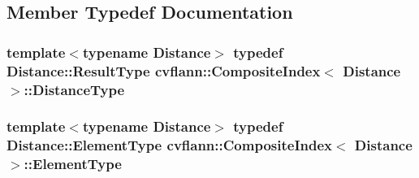 \subsection{Member Typedef Documentation}
\hypertarget{classcvflann_1_1CompositeIndex_a9970db892c04fb4dcb0b8a1c2e80a165}{
\subsubsection[{Distance\-Type}]{\setlength{\rightskip}{0pt plus 5cm}template$<$typename Distance$>$ typedef Distance\-::\-Result\-Type {\bf cvflann\-::\-Composite\-Index}$<$ Distance $>$\-::{\bf Distance\-Type}}}\label{classcvflann_1_1CompositeIndex_a9970db892c04fb4dcb0b8a1c2e80a165}
\hypertarget{classcvflann_1_1CompositeIndex_a3953e495ac70dfec4d1165a8f95b5fad}{
\subsubsection[{Element\-Type}]{\setlength{\rightskip}{0pt plus 5cm}template$<$typename Distance$>$ typedef Distance\-::\-Element\-Type {\bf cvflann\-::\-Composite\-Index}$<$ Distance $>$\-::{\bf Element\-Type}}}\label{classcvflann_1_1CompositeIndex_a3953e495ac70dfec4d1165a8f95b5fad}


